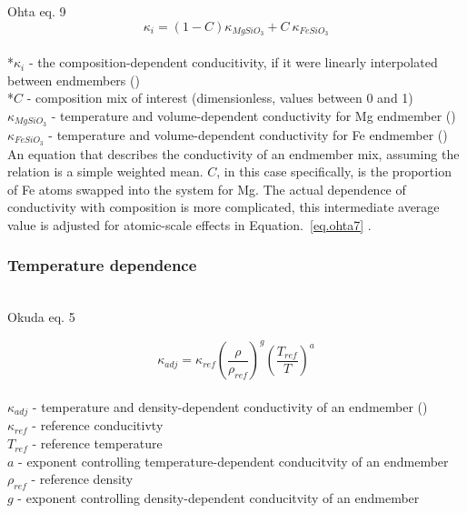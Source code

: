 Ohta eq. 9 
\begin{equation}%
\kappa_{i}=\left ( 1-C \right )\kappa_{MgSiO_{3}}+C\ \kappa_{FeSiO_{3}}
\label{eq.ohta9}
\end{equation}%
\\ *$\kappa_{i}$ - the composition-dependent conducitivity, if it were linearly interpolated between endmembers (\wmk)\\
*$C$ - composition mix of interest (dimensionless, values between 0 and 1)\\
$\kappa_{MgSiO_{3}}$ - temperature and volume-dependent conductivity for Mg endmember (\wmk)\\
$\kappa_{FeSiO_{3}}$ - temperature and volume-dependent conductivity for Fe endmember (\wmk)\\

An equation that describes the conductivity of an endmember mix, assuming the relation is a simple weighted mean. $C$, in this case specifically, is the proportion of Fe atoms swapped into the system for Mg. The actual dependence of conductivity with composition is more complicated, this intermediate average value is adjusted for atomic-scale effects in Equation.~\ref{eq.ohta7} \citep[][Eq. 7]{Ohta2017}. \\

\subsubsection{Temperature dependence}

\cite{Okuda2017}\\

Okuda eq. 5 

\begin{equation}%
\kappa_{adj}=\kappa_{ref}\left ( \frac{\rho}{\rho_{ref}} \right )^{g}\left ( \frac{T_{ref}}{T} \right )^{a}
\label{eq.okuda5}
\end{equation}%
\\ $\kappa_{adj}$ - temperature and density-dependent conductivity of an endmember (\wmk)\\
$\kappa_{ref}$ - reference conducitivty\\
$T_{ref}$ - reference temperature\\
$a$ - exponent controlling temperature-dependent conducitvity of an endmember\\
$\rho_{ref}$ - reference density\\
$g$ - exponent controlling density-dependent conducitvity of an endmember\\

